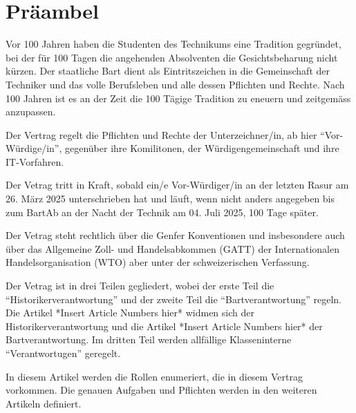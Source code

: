 \documentclass[parskip=half]{scrreprt}
\begin{document}


\section*{Präambel}
Vor 100 Jahren haben die Studenten des Technikums eine Tradition gegründet, bei der für 100 Tagen die angehenden Absolventen die Gesichtsbeharung nicht kürzen.
Der staatliche Bart dient als Eintritszeichen in die Gemeinschaft der Techniker und das volle Berufsleben und alle dessen Pflichten und Rechte.
Nach 100 Jahren ist es an der Zeit die 100 Tägige Tradition zu eneuern und zeitgemäss anzupassen.

\begin{contract}

  Der Vertrag regelt die Pflichten und Rechte der Unterzeichner/in, ab hier ``Vor-Würdige/in'', gegenüber ihre Komilitonen, der Würdigengemeinschaft und ihre IT-Vorfahren.

  Der Vetrag tritt in Kraft, sobald ein/e Vor-Würdiger/in an der letzten Rasur am 26. März 2025 unterschrieben hat und läuft, wenn nicht anders angegeben bis zum BartAb an der Nacht der Technik am 04. Juli 2025, 100 Tage später.

  Der Vetrag steht rechtlich über die Genfer Konventionen und insbesondere auch über das Allgemeine Zoll- und Handelsabkommen (GATT) der Internationalen Handelsorganisation (WTO) aber unter der schweizerischen Verfassung.

  Der Vetrag ist in drei Teilen gegliedert, wobei der erste Teil die ``Historikerverantwortung'' und der zweite Teil die ``Bartverantwortung'' regeln.
  Die Artikel *Insert Article Numbers hier* widmen sich der Historikerverantwortung und die Artikel *Insert Article Numbers hier* der Bartverantwortung.
  Im dritten Teil werden allfällige Klasseninterne ``Verantwortugen'' geregelt.

  In diesem Artikel werden die Rollen enumeriert, die in diesem Vertrag vorkommen. Die genauen Aufgaben und Pflichten werden in den weiteren Artikeln definiert.


\end{contract}
\end{document}
